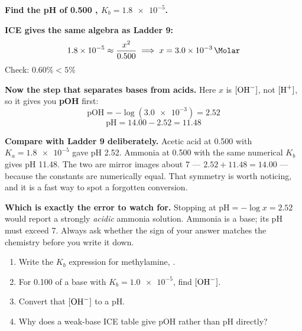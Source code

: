 \documentclass{apchem-worksheet}
\begin{document}
\begin{workedexample}
\textbf{Find the pH of \SI{0.500}{\Molar} ,
$K_{b} = \num{1.8e-5}$.}

\textbf{ICE gives the same algebra as Ladder 9:}
\[ \num{1.8e-5} \approx \frac{x^{2}}{0.500}
   \;\Longrightarrow\;
   x = \SI{3.0e-3}{\Molar} \]
Check: $0.60\% < 5\%$ \checkmark

\textbf{Now the step that separates bases from acids.} Here $x$ is
$[\ce{OH-}]$, not $[\ce{H+}]$, so it gives you \textbf{pOH} first:
\[ \text{pOH} = -\log(\num{3.0e-3}) = 2.52 \]
\[ \text{pH} = 14.00 - 2.52 = \mathbf{11.48} \]

\textbf{Compare with Ladder 9 deliberately.} Acetic acid at
\SI{0.500}{\Molar} with $K_{a} = \num{1.8e-5}$ gave pH 2.52. Ammonia at
\SI{0.500}{\Molar} with the same numerical $K_{b}$ gives pH 11.48. The
two are mirror images about 7 --- $2.52 + 11.48 = 14.00$ --- because the
constants are numerically equal. That symmetry is worth noticing, and it
is a fast way to spot a forgotten conversion.

\textbf{Which is exactly the error to watch for.} Stopping at
$\text{pH} = -\log x = 2.52$ would report a strongly \emph{acidic}
ammonia solution. Ammonia is a base; its pH must exceed 7. Always ask
whether the sign of your answer matches the chemistry before you write
it down.
\end{workedexample}

\begin{yourturn}
\begin{enumerate}[leftmargin=*,itemsep=0.5em]
  \item Write the $K_{b}$ expression for methylamine, .
        \workspace[1.8cm]
  \item For \SI{0.100}{\Molar} of a base with $K_{b} = \num{1.0e-5}$,
        find $[\ce{OH-}]$. \workspace[1.8cm]
  \item Convert that $[\ce{OH-}]$ to a pH. \workspace[1.8cm]
  \item Why does a weak-base ICE table give pOH rather than pH
        directly? \workspace[1.8cm]
\end{enumerate}
\end{yourturn}
\end{document}
